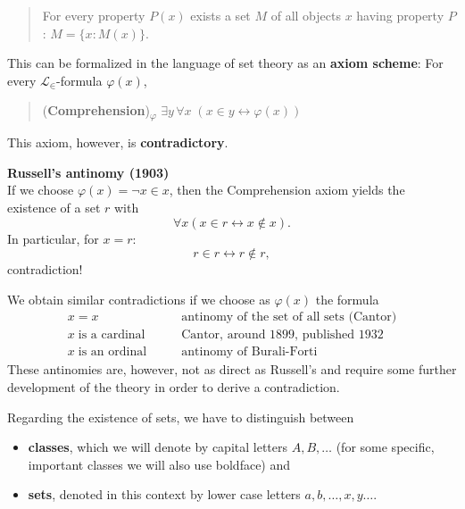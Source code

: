 \documentclass{article}
\begin{document}
\begin{quote}
For every property $P(x)$ exists a set $M$ of all objects $x$ having property $P$:  $M =\{x: M(x) \}$.
\end{quote}

This can be formalized in the language of set theory as an \textbf{axiom scheme}: For every $\mathcal{L}_\in$-formula $\varphi(x)$,

\begin{quote}
(\textbf{Comprehension})\textsubscript{$\varphi$} $\exists y \, \forall x \; ( x \in y \leftrightarrow \varphi(x))$
\end{quote}

This axiom, however, is \textbf{contradictory}.

\begin{framed}
\textbf{Russell's antinomy (1903)}\\
If we choose $\varphi(x) = \neg x \in x$, then the Comprehension axiom yields the existence of a set $r$ with
\begin{equation*}
\forall x ( x \in  r \leftrightarrow x \not \in x).
\end{equation*}
In particular, for $x = r$:
\begin{equation*}
r \in  r \leftrightarrow r \not \in r ,
\end{equation*}
contradiction!
\end{framed}

We obtain similar contradictions if we choose as $\varphi(x)$ the formula
\begin{align*}
     x = x  \qquad &  \text{antinomy of the set of all sets (Cantor)} \\
     x\;\text{is a cardinal} \qquad & \text{Cantor, around 1899, published 1932}\\
     x \; \text{is an ordinal} \qquad &   \text{antinomy of Burali-Forti}
\end{align*}
These antinomies are, however, not as direct as Russell's and require some further development of the theory in order to derive a contradiction.

Regarding the existence of sets, we have to distinguish between

\begin{itemize}
\item \textbf{classes}, which we will denote by capital letters $A,B,\dots$ (for some specific, important classes we will also use boldface) and
\item \textbf{sets}, denoted in this context by lower case letters $a,b,\ldots,x,y \ldots$.
\end{itemize}
\end{document}
